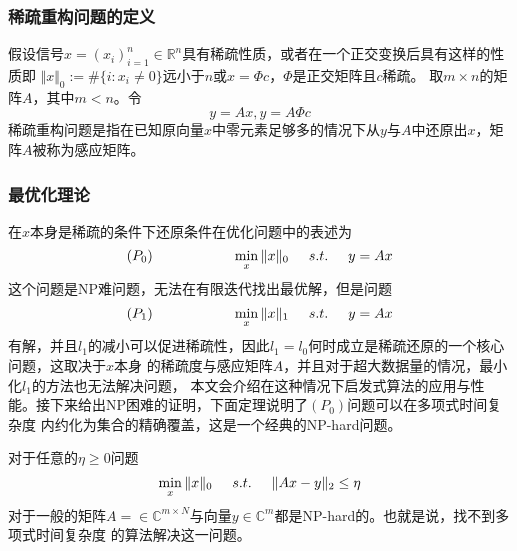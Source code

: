 \subsubsection{稀疏重构问题的定义}
假设信号$x=\left(x_i\right)^n_{i=1}\in \mathbb{R}^n$具有稀疏性质，或者在一个正交变换后具有这样的性质即
$\Vert x\Vert_0:=\# \{i:x_i \neq 0\}$远小于$n$或$x=\Phi c$，$\Phi$是正交矩阵且$c$稀疏。
取$m\times n$的矩阵$A$，其中$m<n$。令
\begin{equation}
    y=Ax,y=A\Phi c
\end{equation}
稀疏重构问题是指在已知原向量$x$中零元素足够多的情况下从$y$与$A$中还原出$x$，矩阵$A$被称为感应矩阵。

\subsubsection{最优化理论}
在$x$本身是稀疏的条件下还原条件在优化问题中的表述为
\begin{equation}
    \left( P_0\right) \hspace{2cm}\min_x\Vert x\Vert_0\hspace{0.5cm} s.t.\hspace{0.5cm} y=Ax
\end{equation}
这个问题是NP难问题，无法在有限迭代找出最优解，但是问题
\begin{equation}
    \left( P_1\right) \hspace{2cm}\min_x\Vert x\Vert_1\hspace{0.5cm} s.t.\hspace{0.5cm} y=Ax
\end{equation}
有解，并且$l_1$的减小可以促进稀疏性，因此$l_1=l_0$何时成立是稀疏还原的一个核心问题，这取决于$x$本身
的稀疏度与感应矩阵$A$，并且对于超大数据量的情况，最小化$l_1$的方法也无法解决问题，
本文会介绍在这种情况下启发式算法的应用与性能。接下来给出NP困难的证明，下面定理说明了$(P_0)$问题可以在多项式时间复杂度
内约化为集合的精确覆盖，这是一个经典的NP-hard问题。
\begin{theorem}
    对于任意的$\eta\ge 0$问题
    \begin{equation}
        \min_x\Vert x\Vert_0\hspace{0.5cm} s.t.\hspace{0.5cm} \Vert Ax-y\Vert_2\le \eta
    \end{equation}
    对于一般的矩阵$A=\in\mathbb{C}^{m \times N}$与向量$y\in\mathbb{C}^m$都是NP-hard的。也就是说，找不到多项式时间复杂度
    的算法解决这一问题。
\end{theorem}
